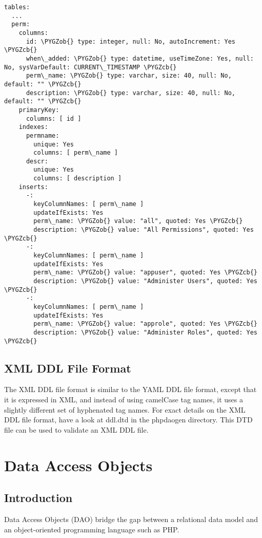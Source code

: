 \documentclass[letterpaper,10pt,english]{sphinxmanual}
\def\PYGZob{\char`\{}
\def\PYGZcb{\char`\}}
\begin{document}
\begin{Verbatim}[commandchars=\\\{\}]
tables:
  ...
  perm:
    columns:
      id: \PYGZob{} type: integer, null: No, autoIncrement: Yes \PYGZcb{}
      when\_added: \PYGZob{} type: datetime, useTimeZone: Yes, null: No, sysVarDefault: CURRENT\_TIMESTAMP \PYGZcb{}
      perm\_name: \PYGZob{} type: varchar, size: 40, null: No, default: "" \PYGZcb{}
      description: \PYGZob{} type: varchar, size: 40, null: No, default: "" \PYGZcb{}
    primaryKey:
      columns: [ id ]
    indexes:
      permname:
        unique: Yes
        columns: [ perm\_name ]
      descr:
        unique: Yes
        columns: [ description ]
    inserts:
      -:
        keyColumnNames: [ perm\_name ]
        updateIfExists: Yes
        perm\_name: \PYGZob{} value: "all", quoted: Yes \PYGZcb{}
        description: \PYGZob{} value: "All Permissions", quoted: Yes \PYGZcb{}
      -:
        keyColumnNames: [ perm\_name ]
        updateIfExists: Yes
        perm\_name: \PYGZob{} value: "appuser", quoted: Yes \PYGZcb{}
        description: \PYGZob{} value: "Administer Users", quoted: Yes \PYGZcb{}
      -:
        keyColumnNames: [ perm\_name ]
        updateIfExists: Yes
        perm\_name: \PYGZob{} value: "approle", quoted: Yes \PYGZcb{}
        description: \PYGZob{} value: "Administer Roles", quoted: Yes \PYGZcb{}
\end{Verbatim}


\subsection{XML DDL File Format}
\label{jaxFrameworkGuide:xml-ddl-file-format}
The XML DDL file format is similar to the YAML DDL file format, except that it is expressed in XML,
and instead of using camelCase tag names, it uses a slightly different set of hyphenated tag names.
For exact details on the XML DDL file format, have a look at ddl.dtd in the phpdaogen directory.
This DTD file can be used to validate an XML DDL file.


\section{Data Access Objects}
\label{jaxFrameworkGuide:data-access-objects}

\subsection{Introduction}
\label{jaxFrameworkGuide:id17}
Data Access Objects (DAO) bridge the gap between a relational data model and an object-oriented
programming language such as PHP.
\end{document}
